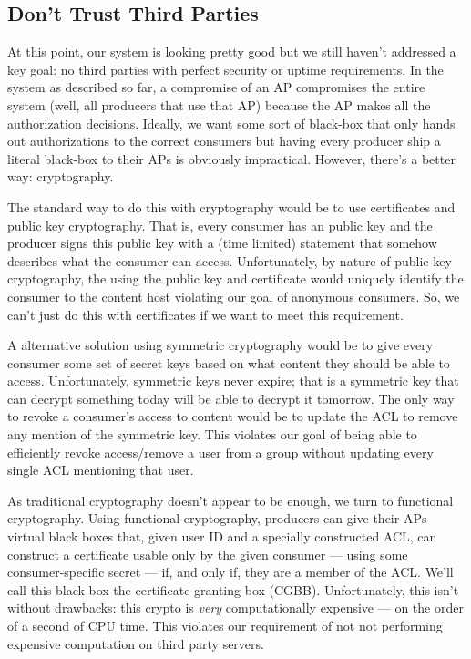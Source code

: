 \documentclass[pdftex,12pt,a4papaer,twoside,notitlepage]{report}
\begin{document}
\subsection{Don't Trust Third Parties}

At this point, our system is looking pretty good but we still haven't addressed
a key goal: no third parties with perfect security or uptime requirements. In
the system as described so far, a compromise of an AP compromises the entire
system (well, all producers that use that AP) because the AP makes all the
authorization decisions. Ideally, we want some sort of black-box that only hands
out authorizations to the correct consumers but having every producer ship a
literal black-box to their APs is obviously impractical. However, there's a
better way: cryptography.

The standard way to do this with cryptography would be to use certificates and
public key cryptography. That is, every consumer has an public key and the
producer signs this public key with a (time limited) statement that somehow
describes what the consumer can access. Unfortunately, by nature of public key
cryptography, the using the public key and certificate would uniquely identify
the consumer to the content host violating our goal of anonymous consumers. So,
we can't just do this with certificates if we want to meet this requirement.

A alternative solution using symmetric cryptography would be to give every
consumer some set of secret keys based on what content they should be able to
access. Unfortunately, symmetric keys never expire; that is a symmetric key that
can decrypt something today will be able to decrypt it tomorrow. The only way to
revoke a consumer's access to content would be to update the ACL to remove any
mention of the symmetric key. This violates our goal of being able to
efficiently revoke access/remove a user from a group without updating every
single ACL mentioning that user.

As traditional cryptography doesn't appear to be enough, we turn to functional
cryptography. Using functional cryptography, producers can give their APs
virtual black boxes that, given user ID and a specially constructed ACL, can
construct a certificate usable only by the given consumer --- using some
consumer-specific secret --- if, and only if, they are a member of the ACL.
We'll call this black box the certificate granting box (CGBB). Unfortunately,
this isn't without drawbacks: this crypto is \emph{very} computationally
expensive --- on the order of a second of CPU time. This violates our
requirement of not not performing expensive computation on third party servers.
\end{document}
